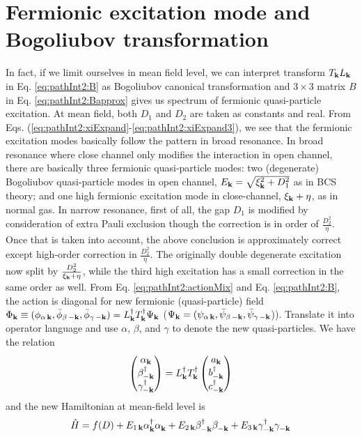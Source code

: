 \section{Fermionic excitation mode and Bogoliubov transformation}
In fact, if we limit ourselves in mean field level, we can interpret transform $T_{\mathbf{k}}{}L_{\mathbf{k}}$ in Eq. \eqref{eq:pathInt2:B} as Bogoliubov canonical transformation and $3\times3$ matrix $B$ in Eq. \eqref{eq:pathInt2:Bapprox} gives us spectrum of fermionic quasi-particle excitation.  At mean field, both $D_{1}$ and $D_{2}$ are taken as constants and real.  From Eqs. (\ref{eq:pathInt2:xiExpand}-\ref{eq:pathInt2:xiExpand3}), we see that the fermionic excitation modes basically follow the pattern in broad resonance.  In broad resonance where close channel only modifies the interaction in open channel,  there are basically three fermionic quasi-particle modes: two (degenerate) Bogoliubov quasi-particle modes  in open channel, $E_{\mathbf{k}}=\sqrt{\xi^{2}_{\mathbf{k}}+D_{1}^{2}}$ as in BCS theory; and one high fermionic excitation mode in close-channel, $\xi_{\mathbf{k}}+\eta$, as in normal gas.  In narrow resonance, first of all, the gap $D_{1}$ is modified  by consideration of extra Pauli exclusion though the correction is in order of $\frac{D_2^2}{\eta}$.  Once that is taken into account, the above conclusion is approximately correct except high-order correction in $\frac{D_{2}^{2}}{\eta}$.   The originally double degenerate excitation now split by $\frac{D_{2}^{2}}{\xi_{\mathbf{k}}+\eta}$, while the third high excitation has a small correction in the same order as well.  From Eq. \eqref{eq:pathInt2:actionMix} and Eq. \eqref{eq:pathInt2:B}, the action is diagonal for new fermionic (quasi-particle) field $\Phi_{\mathbf{k}}\equiv(\phi_{\alpha\,\mathbf{k}},\bar\phi_{\beta\,-\mathbf{k}},\bar\phi_{\gamma\,-\mathbf{k}})=L^{\dagger}_{\mathbf{k}}T^{\dagger}_{\mathbf{k}}\Psi_{\mathbf{k}}$ ($\Psi_{\mathbf{k}}=(\psi_{\alpha\,\mathbf{k}},\bar\psi_{\beta\,-\mathbf{k}},\bar\psi_{\gamma\,-\mathbf{k}}$)).   Translate it into operator language and use $\alpha$, $\beta$, and $\gamma$ to denote the new quasi-particles.  We have the relation
\begin{equation}
\begin{pmatrix}\alpha_{\mathbf{k}}\\\beta_{-\mathbf{k}}^{\dagger}\\\gamma_{-\mathbf{k}}^{\dagger}\end{pmatrix}
=L^{\dagger}_{\mathbf{k}}T^{\dagger}_{\mathbf{k}}  \begin{pmatrix}a_{\mathbf{k}}\\b_{-\mathbf{k}}^{\dagger}\\c_{-\mathbf{k}}^{\dagger}\end{pmatrix}
\end{equation}   
and the new Hamiltonian at mean-field level is 
\begin{equation}
\hat{H}=f(D)+E_{1\,\mathbf{k}}\alpha^{\dagger}_{\mathbf{k}}\alpha^{}_{\mathbf{k}}
+E_{2\,\mathbf{k}}\beta^{\dagger}_{-\mathbf{k}}\beta^{}_{-\mathbf{k}}+E_{3\,\mathbf{k}}\gamma^{\dagger}_{-\mathbf{k}}\gamma^{}_{-\mathbf{k}}
\end{equation}
